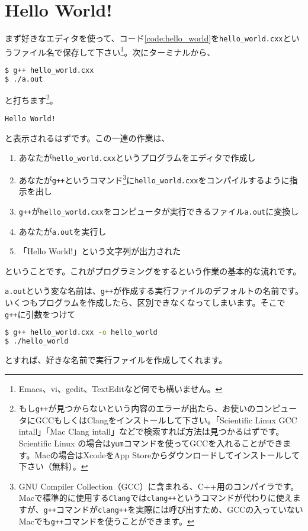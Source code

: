 \section{Hello World!}
\label{sec:helloworld}

まず好きなエディタを使って、コード\ref{code:hello_world}を\texttt{hello\_world.cxx}というファイル名で保存して下さい\footnote{Emacs、vi、gedit、TextEditなど何でも構いません。}。次にターミナルから、
\begin{lstlisting}[language=bash]
$ g++ hello_world.cxx
$ ./a.out
\end{lstlisting}
と打ちます\footnote{もし\texttt{g++}が見つからないという内容のエラーが出たら、お使いのコンピュータにGCCもしくはClangをインストールして下さい。「Scientific Linux GCC intall」「Mac Clang intall」などで検索すれば方法は見つかるはずです。Scientific Linux の場合は\texttt{yum}コマンドを使ってGCCを入れることができます。Macの場合はXcodeをApp Storeからダウンロードしてインストールして下さい（無料）。}。
\begin{lstlisting}
Hello World!
\end{lstlisting}
と表示されるはずです。この一連の作業は、
\begin{enumerate}
  \item あなたが\texttt{hello\_world.cxx}というプログラムをエディタで作成し
  \item あなたが\texttt{g++}というコマンド\footnote{GNU Compiler Collection（GCC）に含まれる、C++用のコンパイラです。Macで標準的に使用する\texttt{Clang}では\texttt{clang++}というコマンドが代わりに使えますが、\texttt{g++}コマンドが\texttt{clang++}を実際には呼び出すため、GCCの入っていないMacでも\texttt{g++}コマンドを使うことができます。}に\texttt{hello\_world.cxx}をコンパイルするように指示を出し
  \item \texttt{g++}が\texttt{hello\_world.cxx}をコンピュータが実行できるファイル\texttt{a.out}に変換し
  \item あなたが\texttt{a.out}を実行し
  \item 「Hello World!」という文字列が出力された
\end{enumerate}
ということです。これがプログラミングをするという作業の基本的な流れです。

\texttt{a.out}という変な名前は、\texttt{g++}が作成する実行ファイルのデフォルトの名前です。いくつもプログラムを作成したら、区別できなくなってしまいます。そこで\texttt{g++}に引数をつけて
\begin{lstlisting}[language=bash]
$ g++ hello_world.cxx -o hello_world
$ ./hello_world
\end{lstlisting}
とすれば、好きな名前で実行ファイルを作成してくれます。

